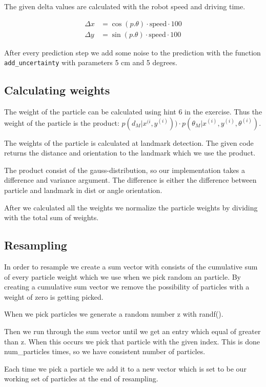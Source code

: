 \documentclass[a4paper,12pt]{article}
\begin{document}
The given delta values are calculated with the robot speed and driving time.

\begin{align*}
\Delta x &= \cos(p.\theta)\cdot\text{speed}\cdot 100\\
\Delta y &= \sin(p.\theta)\cdot\text{speed}\cdot 100
\end{align*}

After every prediction step we add some noise to the prediction with the
function \texttt{add_uncertainty} with parameters 5 cm and 5 degrees.

\subsection{Calculating weights}

The weight of the particle can be calculated using hint 6 in the exercise. Thus
the weight of the particle is the product: $p(d_M | x^{(i}, y^{(i)})) \cdot
p(\theta_M |x^{(i)} , y^{(i)} , \theta^{(i)} ) $.

The weights of the particle is calculated at landmark detection. The given code
returns the distance and orientation to the landmark which we use the product.

The product consist of the gauss-distribution, so our implementation takes a
difference and variance argument. The difference is either the difference
between particle and landmark in dist or angle orientation.

After we calculated all the weights we normalize the particle weights by
dividing with the total sum of weights.

\subsection{Resampling}

In order to resample we create a sum vector with consists of the cumulative sum
of every particle weight which we use when we pick random an particle. By
creating a cumulative sum vector we remove the possibility of particles with a
weight of zero is getting picked.

When we pick particles we generate a random number z with randf().

Then we run through the sum vector until we get an entry which equal of greater
than z. When this occurs we pick that particle with the given index. This is
done num_particles times, so we have consistent number of particles.

Each time we pick a particle we add it to a new vector which is set to be our
working set of particles at the end of resampling.
\end{document}
